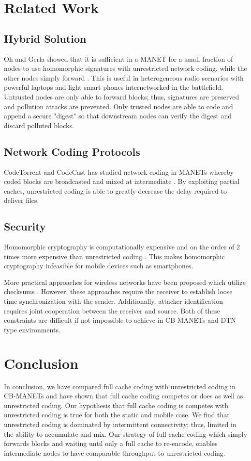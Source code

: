 \section{Related Work}

\subsection{Hybrid Solution}
Oh and Gerla showed that it is sufficient in a MANET for a small fraction of nodes to use homomorphic signatures with unrestricted network coding, while the other nodes simply forward \cite{5437114}. This is useful in heterogeneous radio scenarios with powerful laptops and light smart phones internetworked in the battlefield. Untrusted nodes are only able to forward blocks; thus, signatures are preserved and pollution attacks are prevented. Only trusted nodes are able to code and append a secure "digest" so that downstream nodes can verify the digest and discard polluted blocks.


\subsection{Network Coding Protocols}
CodeTorrent and CodeCast has studied network coding in MANETs whereby coded blocks are broadcasted and mixed at intermediate \cite{Lee:2006:CTC:1161252.1161254,4015713}. By exploiting partial caches, unrestricted coding is able to greatly decrease the delay required to deliver files.

\subsection{Security}
Homomorphic cryptography is computationally expensive and on the order of 2 times more expensive than unrestricted coding \cite{5978945}. This makes homomorphic cryptography infeasible for mobile devices such as smartphones.

More practical approaches for wireless networks have been proposed which utilize checksums \cite{dong2009practical}. However, these approaches require the receiver to establish loose time synchronization with the sender. Additionally, attacker identification requires joint cooperation between the receiver and source. Both of these constraints are difficult if not impossible to achieve in CB-MANETs and DTN type environments.

\section{Conclusion}
In conclusion, we have compared full cache coding with unrestricted coding in CB-MANETs and have shown that full cache coding competes or does as well as unrestricted coding. Our hypothesis that full cache coding is competes with unrestricted coding is true for both the static and mobile case. We find that unrestricted coding is dominated by intermittent connectivity; thus, limited in the ability to accumulate and mix. Our strategy of full cache coding which simply forwards blocks and waiting until only a full cache to re-encode, enables intermediate nodes to have comparable throughput to unrestricted coding. 


